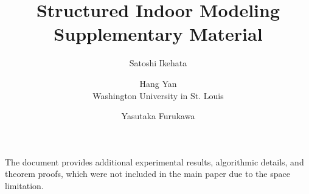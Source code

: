 \documentclass[10pt,twocolumn,letterpaper]{article}
\newcommand{\yasu}[1]{\textcolor{magenta}{[yasu: {#1}]}}
\begin{document}
\title{Structured Indoor Modeling\\Supplementary Material}
\author{Satoshi Ikehata\\
	\and
	Hang Yan\\
	Washington University in St. Louis\\
	\and
	Yasutaka Furukawa\\
}
\maketitle
%

The document provides additional experimental results, algorithmic
details, and theorem proofs, which were not included in the main paper
due to the space limitation.



















{\small
	
	
}
\end{document}
